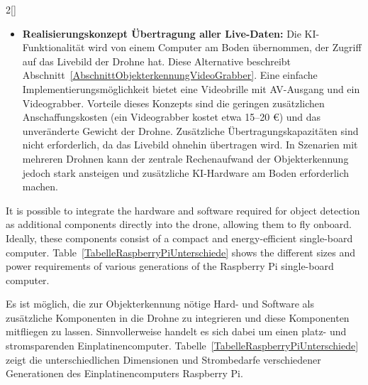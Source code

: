 \begin{paracol}{2}[]
\colger

\begin{itemize}
\item \textbf{Realisierungskonzept Übertragung aller Live-Daten:} Die KI-Funktionalität wird von einem Computer am Boden übernommen, der Zugriff auf das Livebild der Drohne hat. Diese Alternative beschreibt Abschnitt~\ref{AbschnittObjekterkennungVideoGrabber}. Eine einfache Implementierungsmöglichkeit bietet eine Videobrille mit AV-Ausgang und ein Videograbber. Vorteile dieses Konzepts sind die geringen zusätzlichen Anschaffungskosten (ein Videograbber kostet etwa 15--20 €) und das unveränderte Gewicht der Drohne. Zusätzliche Übertragungskapazitäten sind nicht erforderlich, da das Livebild ohnehin übertragen wird. In Szenarien mit mehreren Drohnen kann der zentrale Rechenaufwand der Objekterkennung jedoch stark ansteigen und zusätzliche KI-Hardware am Boden erforderlich machen.
\end{itemize}

\colende

\renewcommand{\deutschertitel}{Objekterkennung mit zusätzlicher Hardware an der Drohne}
\renewcommand{\englischertitel}{Object Detection by additional Hardware on the Drone}
\makroabschnitt
\label{AbschnittObjekterkennungHuckepack}


It is possible to integrate the hardware and software required for object detection as additional components directly into the drone, allowing them to fly onboard. Ideally, these components consist of a compact and energy-efficient single-board computer. Table~\ref{TabelleRaspberryPiUnterschiede} shows the different sizes and power requirements of various generations of the Raspberry Pi single-board computer.

\colger

Es ist möglich, die zur Objekterkennung nötige Hard- und Software als zusätzliche Komponenten in die Drohne zu integrieren und diese Komponenten mitfliegen zu lassen. Sinnvollerweise handelt es sich dabei um einen platz- und stromsparenden Einplatinencomputer. Tabelle~\ref{TabelleRaspberryPiUnterschiede} zeigt die unterschiedlichen Dimensionen und Strombedarfe verschiedener Generationen des Einplatinencomputers Raspberry Pi.

\colende


\end{paracol}
